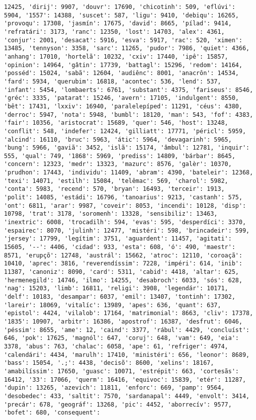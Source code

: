 \begin{Verbatim}[commandchars=\\\{\}]
12425, 'dirij': 9907, 'douvr': 17690, 'chicotinh': 509, 'eflúvi': 5904, '1557': 14388, 'suscet': 587, 'ligu': 9410, 'debiqu': 16265, 'provoqu': 17308, 'jasmín': 17675, 'david': 8665, 'pílad': 9414, 'refratári': 3173, 'ranc': 12350, 'lost': 14703, 'alex': 4361, 'conjur': 2001, 'desacat': 5916, 'esva': 5917, 'rac': 520, 'ximen': 13485, 'tennyson': 3358, 'sarc': 11265, 'pudor': 7986, 'quiet': 4366, 'anhang': 17010, 'hortelã': 10232, 'cxiv': 17440, 'ipê': 15857, 'opinion': 14964, 'gâtin': 17739, 'battagl': 15296, 'redom': 14164, 'posséd': 15024, 'sabã': 12604, 'audiênc': 8001, 'anacrôn': 14534, 'fard': 5934, 'querubim': 16818, 'acontec': 536, 'lend': 537, 'infant': 5454, 'lombaerts': 6761, 'substant': 4375, 'fariseus': 8546, 'gréc': 3335, 'patarat': 15246, 'avern': 17105, 'indulgent': 8550, 'bêt': 17431, 'lxxiv': 16940, 'paralelepíped': 11291, 'céus': 4380, 'derroc': 5947, 'nota': 5948, 'bumbl': 18120, 'man': 543, 'fof': 4383, 'fair': 10356, 'aristocrat': 15689, 'quer': 546, 'host': 13248, 'conflit': 548, 'indefer': 12424, 'gilliatt': 17771, 'péricl': 5959, 'alcind': 16110, 'bruc': 5963, 'átic': 5964, 'devagarinh': 5965, 'bung': 5966, 'gaviã': 3452, 'islã': 15174, 'âmbul': 12781, 'inquir': 555, 'qual': 749, '1868': 5969, 'prediss': 14809, 'bárbar': 8645, 'concern': 12323, 'medr': 13323, 'mazurc': 8576, 'galèr': 10370, 'prudhon': 17443, 'individu': 11409, 'abram': 4390, 'bateleir': 12368, 'texi': 14071, 'estilh': 15084, 'telêmac': 569, 'charol': 5982, 'conta': 5983, 'recend': 570, 'bryan': 16493, 'terceir': 1913, 'polit': 14085, 'estádi': 16796, 'tanoarius': 9213, 'castanh': 575, 'ont': 6811, 'arar': 9987, 'coveir': 8053, 'incendi': 10128, 'disp': 10798, 'trat': 3178, 'soromenh': 13328, 'sensibiliz': 13463, 'inextric': 6008, 'trocadilh': 594, 'evas': 595, 'desperdíci': 3370, 'espairec': 8070, 'julinh': 12477, 'mistéri': 598, 'brincadeir': 599, 'jersey': 17799, 'legítim': 3751, 'aguardent': 11457, 'agitati': 15605, '--': 4406, 'cidad': 933, 'esta': 608, 'ó': 490, 'maestr': 8571, 'erupçõ': 12748, 'austrál': 15662, 'atroc': 12110, 'coroaçã': 10410, 'aprec': 3816, 'reverendíssim': 7228, 'impéri': 614, 'inib': 11387, 'canoniz': 8090, 'card': 5311, 'cabid': 4418, 'altar': 625, 'hermenegild': 14746, 'ilmo': 14255, 'desabroch': 6033, 'sós': 628, 'nag': 15203, 'limb': 16811, 'religi': 3908, 'legendár': 10171, 'delf': 10183, 'desampar': 6037, 'emil': 13407, 'tontinh': 17302, 'lareir': 18069, 'vitalíc': 13989, 'apes': 636, 'quant': 637, 'epistol': 4424, 'vilalob': 17164, 'matrimonial': 8663, 'cliv': 17378, '1835': 10907, 'arbitr': 16386, 'apostrof': 16387, 'desfrut': 6046, 'péssim': 8655, 'ame': 12, 'caind': 3377, 'rábul': 4429, 'concluíst': 646, 'pok': 17625, 'magnól': 647, 'coruj': 648, 'vam': 649, 'eia': 3378, 'abus': 763, 'chalac': 6058, 'ape': 61, 'refriger': 4974, 'calendári': 4434, 'marulh': 17410, 'ministéri': 656, 'leonor': 8689, 'bass': 15054, '.;': 4438, 'decisõ': 8600, 'xelins': 18167, 'amabilíssim': 17650, 'guasc': 10071, 'estrépit': 663, 'cortesãs': 16412, '33': 17066, 'querm': 16416, 'equivoc': 15839, 'etér': 11287, 'dupin': 13265, 'azevich': 11811, 'enforc': 669, 'pamp': 9564, 'desobedec': 433, 'saltit': 7570, 'sardanapal': 4449, 'envolt': 3414, 'precár': 678, 'geográf': 13268, 'pic': 4452, 'aborrecív': 9577, 'bofet': 680, 'consequent': 
\end{Verbatim}
